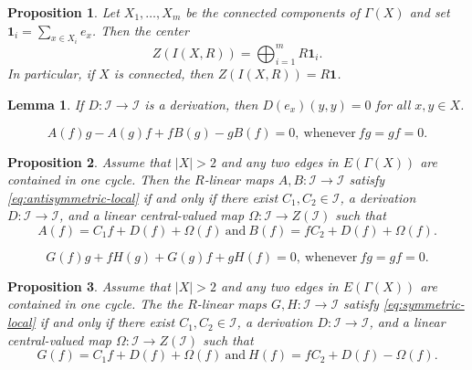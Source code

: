\documentclass[10pt,a4paper]{amsart}
\newtheorem{lemma}{Lemma}
\newtheorem{proposition}{Proposition}
\newcommand{\I}{\mathcal I}
\newcommand{\one}{\mathbf 1}
\begin{document}
\begin{proposition}\label{prop:center}
Let $X_1,\ldots,X_m$ be the connected components of
$\Gamma(X)$ and set $\one_i=\sum_{x\in X_i}e_x$.
Then the center
\[
Z(I(X,R))=\bigoplus_{i=1}^m R\one_i.
\]
In particular, if $X$ is connected, then $Z(I(X,R))=R\one$.
\end{proposition}

\begin{lemma}\label{lem:derivation-diagonal}
If $D:\I\to\I$ is a derivation, then
$D(e_x)(y,y)=0$ for all $x,y\in X$.
\end{lemma}

\begin{equation}\label{eq:antisymmetric-local}
A(f)g-A(g)f+fB(g)-gB(f)=0,~\text{whenever}~fg=gf=0.
\end{equation}

\begin{proposition}\label{thm:antisymmetric-standard-form}
Assume that $|X|>2$ and any two edges in $E(\Gamma(X))$ are contained in one cycle.
Then the $R$-linear maps $A,B:\I\to\I$ satisfy \eqref{eq:antisymmetric-local} if and only if there exist $C_1,C_2\in\I$, a derivation
$D:\I\to\I$, and a linear central-valued map
$\Omega:\I\to Z(\I)$ such that
\begin{equation}\label{eq:antisymmetric-standard-form}
A(f)=C_1f+D(f)+\Omega(f)~\text{and}~
B(f)=fC_2+D(f)+\Omega(f).
\end{equation}
\end{proposition}

\begin{equation}\label{eq:symmetric-local}
G(f)g+fH(g)+G(g)f+gH(f)=0,~\text{whenever}~fg=gf=0.
\end{equation}

\begin{proposition}\label{thm:symmetric-standard-form}
Assume that $|X|>2$ and any two edges in $E(\Gamma(X))$ are contained in one cycle.
The the $R$-linear maps $G,H:\I\to\I$ satisfy \eqref{eq:symmetric-local} if and only if
there exist $C_1,C_2\in\I$, a derivation
$D:\I\to\I$, and a linear central-valued map
$\Omega:\I\to Z(\I)$ such that
\begin{equation}\label{eq:symmetric-standard-form}
G(f)=C_1f+D(f)+\Omega(f)~\text{and}~
H(f)=fC_2+D(f)-\Omega(f).
\end{equation}
\end{proposition}
\end{document}

